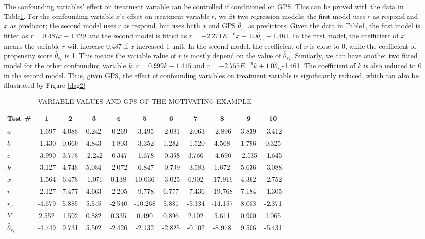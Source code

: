 The confounding variables' effect on treatment variable can be controlled if conditioned on GPS. This can be proved with the data in Table\ref{exampledata}. For the confounding variable $x$'s effect on treatment variable $r$, we fit two regression models: the first model uses $r$ as respond and $x$ as predictor; the second model uses $r$ as respond, but uses both $x$ and GPS ${\hat{\theta}}_{s_8}$ as predictors. Given the data in Table\ref{exampledata}, the first model is fitted as $ r =0.487x-1.729$ and the second model is fitted as $r=-2.271E^{-16}x+ 1.0{\hat{\theta}}_{s_8}-1.461$. In the first model, the coefficient of $x$ means the variable $r$ will increase 0.487 if $x$ increased 1 unit. In the second model, the coefficient of $x$ is close to 0, while the coefficient of propensity score ${\hat{\theta}}_{s_8}$ is 1. This means the variable value of $r$ is mostly depend on the value of  ${\hat{\theta}}_{s_8}$. Similarly, we can have another two fitted model for the other confounding variable $k$: $r=0.999k-1.415$  and $r=-2.755E^{-16}k+1.0{\hat{\theta}}_{s_8}$-1.461.  The coefficient of $k$ is also reduced to 0 in the second model.  Thus, given GPS, the effect of confounding variables on treatment variable is significantly reduced, which can also be illustrated by Figure \ref{dag2}

\begin{table}[htbp!]
\caption{VARIABLE VALUES AND GPS OF THE MOTIVATING EXAMPLE}
\label{exampledata}
\centering
      \begin{tabular}{|l|c|c|c|c|c|c|c|c|c|c|}
      \hline
Test \#	&1	&2&3&4 & 5 &6& 7 & 8 & 9&10\\	\hline

$a$ &-1.697	&	4.088	&	0.242	&	-0.269	&	-3.495	&	-2.081	&	-2.063	&	-2.896	&	3.839	&	-3.412 \\ 	\hline
$b$ & -1.430	&	0.660	&	4.843	&	-1.803	&	-3.352	&	1.282	&	-1.520	&	4.568	&	1.796	&	0.325\\	\hline
$c$ & -3.990	&	3.778	&	-2.242	&	-0.347	&	-1.678	&	-0.358	&	3.766	&	-4.690	&	-2.535	&	-1.645 \\	\hline
$k$ & -3.127	&	4.748	&	5.084	&	-2.072	&	-6.847	&	-0.799	&	-3.583	&	1.672	&	5.636	&	-3.088\\	\hline
$x$ &-1.564	&	6.478	&	-1.071	&	0.138	&	10.036	&	-3.025	&	6.902	&	-17.919	&	4.362	&	-2.752 \\	\hline
$r $& -2.127	&	7.477	&	4.663	&	-2.205	&	-9.778	&	6.777	&	-7.436	&	-19.768	&	7.184	&	-1.305\\	\hline
$r_c$ & -4.679	&	5.885	&	5.545	&	-2.540	&	-10.268	&	5.881	&	-5.334	&	-14.157	&	8.083	&	-2.371 \\	\hline
$Y$ & 2.552	&	1.592	&	0.882	&	0.335	&	0.490	&	0.896	&	2.102	&	5.611	&	0.900	&	1.065 \\	\hline
${\hat{\theta}}_{s_8}$ & -4.749	&	9.731	&	5.502	&	-2.426	&	-2.132	&	-2.825	&	-0.102	&	-8.978	&	9.506	&	-5.431\\	\hline

\end{tabular}
\end{table}


